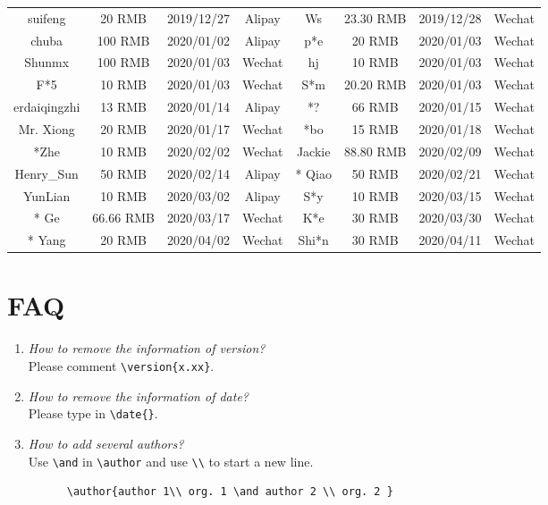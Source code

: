 \documentclass[en,hazy,screen,blue,14pt]{elegantnote}
\begin{document}
\begin{table}[htbp]
\begin{tabular}{cccccccc}
	  suifeng   & 20 RMB & 2019/12/27 & Alipay   & Ws    & 23.30 RMB & 2019/12/28 & Wechat \\
	  chuba    & 100 RMB  & 2020/01/02 & Alipay   & p*e   & 20 RMB & 2020/01/03 & Wechat \\
	  Shunmx & 100 RMB & 2020/01/03 & Wechat    & hj    & 10 RMB & 2020/01/03 & Wechat \\
	  F*5   & 10 RMB & 2020/01/03 & Wechat    & S*m   & 20.20 RMB & 2020/01/03 & Wechat \\
	  erdaiqingzhi  & 13 RMB & 2020/01/14 & Alipay   & *?    & 66 RMB & 2020/01/15 & Wechat \\
	  Mr. Xiong & 20 RMB & 2020/01/17 & Wechat    & *bo    & 15 RMB & 2020/01/18 & Wechat \\
	  *Zhe    & 10 RMB & 2020/02/02 & Wechat    &  Jackie &  88.80 RMB  &  2020/02/09 & Wechat \\
	  Henry\_Sun & 50 RMB & 2020/02/14 & Alipay & * Qiao  & 50 RMB & 2020/02/21 & Wechat \\
	  YunLian & 10 RMB & 2020/03/02 & Alipay & S*y  &  10 RMB  &  2020/03/15 & Wechat \\
	  * Ge  & 66.66 RMB & 2020/03/17 & Wechat    &   K*e & 30 RMB & 2020/03/30 & Wechat\\
	  * Yang  &  20 RMB  &  2020/04/02 & Wechat & Shi*n  & 30 RMB & 2020/04/11 & Wechat \\
\bottomrule
\end{tabular}%
  \label{tab:donation}%
\end{table}%


\section{FAQ}

\begin{enumerate}[label=\arabic*).]
	\item \textit{How to remove the information of version?}\\
    Please comment \lstinline|\version{x.xx}|.
	\item \textit{How to remove the information of date?}\\
	  Please type in \lstinline|\date{}|.
	\item \textit{How to add several authors?}\\
	  Use \lstinline{\and} in \lstinline{\author} and use \lstinline{\\} to start a new line.
    \begin{lstlisting}
      \author{author 1\\ org. 1 \and author 2 \\ org. 2 }
    \end{lstlisting}
\end{enumerate}
\end{document}
